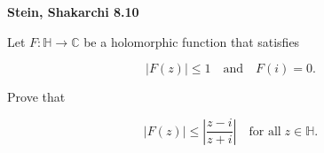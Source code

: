 \textbf{Stein, Shakarchi 8.10}

Let $F : \mathbb{H} \to \mathbb{C}$ be a holomorphic function that satisfies

$$
|F(z)| \leq 1 \quad \text{and} \quad F(i) = 0.
$$

Prove that

$$
|F(z)| \leq \left| \frac{z - i}{z + i}  \right| \quad \text{for all} \; z \in \mathbb{H}.
$$

\begin{solution}
  \ \\
\end{solution}
